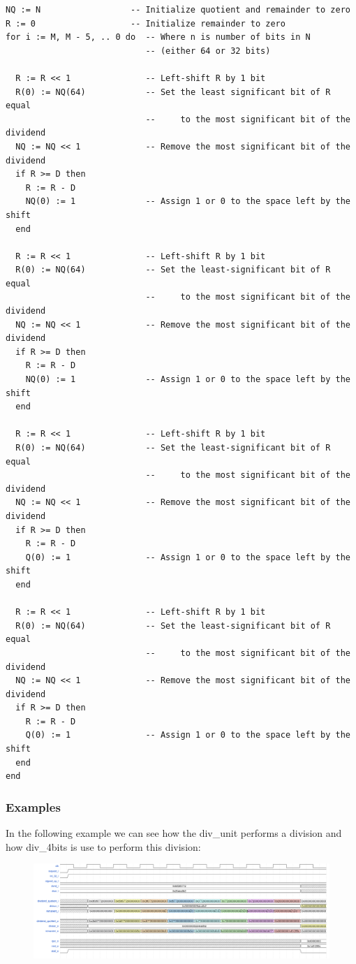 \begin{lstlisting}[label=unroll, caption=Unroll division]
NQ := N                  -- Initialize quotient and remainder to zero
R := 0                   -- Initialize remainder to zero
for i := M, M - 5, .. 0 do  -- Where n is number of bits in N 
                            -- (either 64 or 32 bits)

  R := R << 1               -- Left-shift R by 1 bit
  R(0) := NQ(64)            -- Set the least significant bit of R equal 
                            --     to the most significant bit of the dividend
  NQ := NQ << 1             -- Remove the most significant bit of the dividend
  if R >= D then
    R := R - D
    NQ(0) := 1              -- Assign 1 or 0 to the space left by the shift
  end
  
  R := R << 1               -- Left-shift R by 1 bit
  R(0) := NQ(64)            -- Set the least-significant bit of R equal 
                            --     to the most significant bit of the dividend
  NQ := NQ << 1             -- Remove the most significant bit of the dividend
  if R >= D then
    R := R - D
    NQ(0) := 1              -- Assign 1 or 0 to the space left by the shift
  end
 
  R := R << 1               -- Left-shift R by 1 bit
  R(0) := NQ(64)            -- Set the least-significant bit of R equal 
                            --     to the most significant bit of the dividend
  NQ := NQ << 1             -- Remove the most significant bit of the dividend
  if R >= D then
    R := R - D
    Q(0) := 1               -- Assign 1 or 0 to the space left by the shift
  end
  
  R := R << 1               -- Left-shift R by 1 bit
  R(0) := NQ(64)            -- Set the least-significant bit of R equal 
                            --     to the most significant bit of the dividend
  NQ := NQ << 1             -- Remove the most significant bit of the dividend
  if R >= D then
    R := R - D
    Q(0) := 1               -- Assign 1 or 0 to the space left by the shift
  end
end

\end{lstlisting}


\subsubsection{Examples}

In the following example we can see how the div\_unit performs a division and how div\_4bits is use to perform this division:

\begin{figure}[h]
\centering
\includegraphics[width=14cm]{wave_div.png}
\end{figure}